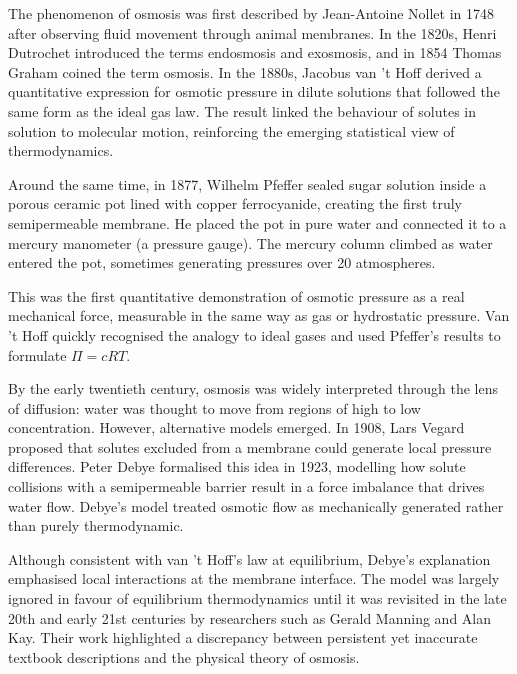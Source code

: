 \begin{historical}
The phenomenon of osmosis was first described by Jean-Antoine Nollet in 1748 after observing fluid movement through animal membranes. In the 1820s, Henri Dutrochet introduced the terms \QSOpen{}endosmosis\QSClose{} and \QSOpen{}exosmosis,\QSClose{} and in 1854 Thomas Graham coined the term \QSOpen{}osmosis.\QSClose{} In the 1880s, Jacobus van 't Hoff derived a quantitative expression for osmotic pressure in dilute solutions that followed the same form as the ideal gas law. The result linked the behaviour of solutes in solution to molecular motion, reinforcing the emerging statistical view of thermodynamics.

Around the same time, in 1877, Wilhelm Pfeffer sealed sugar solution inside a porous ceramic pot lined with copper ferrocyanide, creating the first truly semipermeable membrane. He placed the pot in pure water and connected it to a mercury manometer (a pressure gauge). The mercury column climbed as water entered the pot, sometimes generating pressures over 20 atmospheres.

This was the first quantitative demonstration of osmotic pressure as a real mechanical force, measurable in the same way as gas or hydrostatic pressure. Van 't Hoff quickly recognised the analogy to ideal gases and used Pfeffer's results to formulate $\Pi = cRT$.

By the early twentieth century, osmosis was widely interpreted through the lens of diffusion: water was thought to move from regions of high to low concentration. However, alternative models emerged. In 1908, Lars Vegard proposed that solutes excluded from a membrane could generate local pressure differences. Peter Debye formalised this idea in 1923, modelling how solute collisions with a semipermeable barrier result in a force imbalance that drives water flow. Debye's model treated osmotic flow as mechanically generated rather than purely thermodynamic.

Although consistent with van ’t Hoff’s law at equilibrium, Debye’s explanation emphasised local interactions at the membrane interface. The model was largely ignored in favour of equilibrium thermodynamics until it was revisited in the late 20th and early 21st centuries by researchers such as Gerald Manning and Alan Kay. Their work highlighted a discrepancy between persistent yet inaccurate textbook descriptions and the physical theory of osmosis.
\end{historical}
